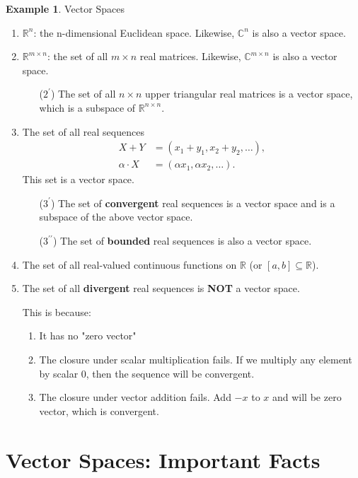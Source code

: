 \documentclass[12pt]{article}
\theoremstyle{definition}
\newtheorem*{example}{Example}
\begin{document}
\begin{example} Vector Spaces
\begin{enumerate}[label = (\arabic*)]
\item $\mathbb{R}^n$: the n-dimensional Euclidean space. Likewise, $\mathbb{C}^n$ is also a
vector space.
\item $\mathbb{R}^{m \times n}$: the set of all $m \times n$ real matrices. Likewise, 
$\mathbb{C}^{m \times n}$ is also a vector space.
\begin{itemize}
\item [($2^{\prime}$)] The set of all $n \times n$ upper triangular real matrices is a 
vector space, which is a subspace of $\mathbb{R}^{n \times n}$.
\end{itemize} 
\item The set of all real sequences
\begin{align*}
X + Y &= (x_1 + y_1, x_2 + y_2, \dots), \\
\alpha \cdot X &= (\alpha x_1, \alpha x_2, \ldots).
\end{align*}
This set is a vector space.
\begin{itemize}
\item [($3^{\prime}$)] The set of \textbf{convergent} real sequences is a vector space and is a subspace
of the above vector space.
\item [($3^{\prime\prime}$)] The set of \textbf{bounded} real sequences is also a vector space.
\end{itemize}
\item The set of all real-valued continuous functions on $\mathbb{R}$ (or $[a,b] \subseteq \mathbb{R}$).
\item The set of all \textbf{divergent} real sequences is \textbf{NOT} a vector space.

This is because:
\begin{enumerate}[label = \arabic*)]
\item It has no "zero vector"
\item The closure under scalar multiplication fails. If we multiply any element by scalar 0, then the
sequence will be convergent.
\item The closure under vector addition fails. Add $-x$ to $x$ and will be zero vector, which is
convergent. 
\end{enumerate}
\end{enumerate}
\end{example}

\section{Vector Spaces: Important Facts}
\end{document}
